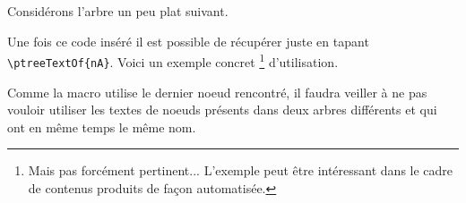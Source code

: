 \documentclass[12pt,a4paper]{article}
\begin{document}






Considérons l'arbre un peu plat suivant.


Une fois ce code inséré il est possible de récupérer  juste en tapant \verb#\ptreeTextOf{nA}#. Voici un exemple concret
\footnote{
	Mais pas forcément pertinent... L'exemple peut être intéressant dans le cadre de contenus produits de façon automatisée.
}
d'utilisation.



\begin{remark}
	Comme la macro  utilise le dernier noeud rencontré, il faudra veiller à ne pas vouloir utiliser les textes de noeuds présents dans deux arbres différents et qui ont en même temps le même nom. 
\end{remark}
\end{document}
